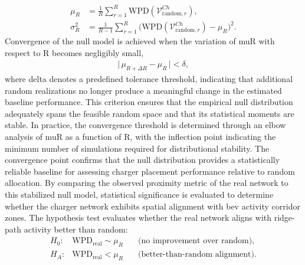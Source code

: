 \begin{align}
\mu_R &= 
\frac{1}{R}\sum_{r=1}^{R} 
\mathrm{WPD}(\mathcal{V}^{Ch}_{\mathrm{random},r}),
\label{eq:null_mean} \\[4pt]
\sigma_R^2 &= 
\frac{1}{R-1}\sum_{r=1}^{R} 
\bigl(\mathrm{WPD}(\mathcal{V}^{Ch}_{\mathrm{random},r}) - \mu_R\bigr)^2.
\label{eq:null_variance}
\end{align}
Convergence of the null model is achieved when the variation of \gls{muR} with respect to \gls{R} becomes negligibly small,
\begin{align}
\bigl|\,\mu_{R+\Delta R} - \mu_{R}\,\bigr| < \delta,
\label{eq:convergence_condition}
\end{align}
where \gls{delta} denotes a predefined tolerance threshold, indicating that additional random realizations no longer produce a meaningful change in the estimated baseline performance.
This criterion ensures that the empirical null distribution adequately spans the feasible random space and that its statistical moments are stable. In practice, the convergence threshold is determined through an elbow analysis of \gls{muR} as a function of \gls{R}, with the inflection point indicating the minimum number of simulations required for distributional stability.
The convergence point confirms that the null distribution provides a statistically reliable baseline for assessing charger placement performance relative to random allocation. By comparing the observed proximity metric of the real network to this stabilized null model, statistical significance is evaluated to determine whether the charger network exhibits spatial alignment with \gls{bev} activity corridor zones.
The hypothesis test evaluates whether the real network aligns with ridge-path activity better than random:
\begin{eqnarray}
H_0\!:\! & \mathrm{WPD}_{\mathrm{real}} \sim \mu_R & \quad \text{(no improvement over random)}, \\[4pt]
H_A\!:\! & \mathrm{WPD}_{\mathrm{real}} < \mu_R & \quad \text{(better-than-random alignment)}.
\label{eq:hypothesis_test}
\end{eqnarray}
